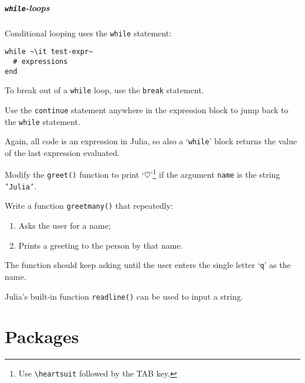 \documentclass[english,serif,mathserif,xcolor=pdftex,dvipsnames,table]{beamer}
\begin{document}
\begin{frame}[fragile]
  \frametitle{\texttt{while}-loops}
  Conditional looping uses the \texttt{while} statement:
\begin{lstlisting}
while ~\it test-expr~
  # expressions
end
\end{lstlisting}

  \+
  To break out of a \texttt{while} loop, use the \texttt{break}
  statement.

  \+
  Use the \texttt{continue} statement anywhere in the expression
  block to jump back to the \texttt{while} statement.

  \+ Again, all code is an expression in Julia, so also a
  `\texttt{while}' block returns the value of the last expression
  evaluated.
\end{frame}


\begin{frame}
  \begin{exercise*}[2.B]
    Modify the \texttt{greet()} function to print `$\heartsuit$'{}\footnote{Use
      \texttt{{\textbackslash}heartsuit} followed by the TAB key.} if
    the argument \texttt{name} is the string \texttt{'Julia'}.
  \end{exercise*}

  \+
  \begin{exercise*}[2.C]
    Write a function \texttt{greetmany()} that repeatedly:
    \begin{enumerate}
    \item     Asks the user for a name;
    \item     Prints a greeting to the person by that name.
    \end{enumerate}

    The function should keep asking until the user enters the single
    letter `\texttt{q}' as the name.

    Julia's built-in function \texttt{readline()} can be used to input a string.
  \end{exercise*}
\end{frame}


\part{Packages}


\end{document}
